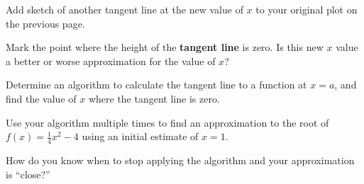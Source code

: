 \begin{problem}
\begin{subproblem}
  \item Add sketch of another tangent line at the new value of $x$ to
    your original plot on the previous page. 

  \item Mark the point where the height of the \textbf{tangent line}
    is zero. Is this new $x$ value a better or worse approximation for
    the value of $x$?


  \end{subproblem}

  \clearpage

\item Determine an algorithm to calculate the tangent line to a
  function at $x=a$, and find the value of $x$ where the tangent line
  is zero.

  \vfill

\clearpage

\item Use your algorithm multiple times to find an approximation to
  the root of $f(x)=\frac{1}{4}x^2-4$ using an initial estimate of
  $x=1$.

  \vfill

\item How do you know when to stop applying the algorithm and your
  approximation is ``close?''

\end{problem}


\postClass

